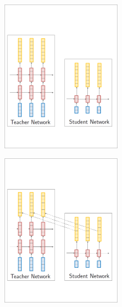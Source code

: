 \documentclass{beamer}
\newcommand{\air}{\vspace{0.25cm}}
\begin{document}
\begin{frame}
\centerline{}
\air 
\begin{figure}
\center
\includegraphics[width=6cm]{word-kd-1}
\end{figure}
\end{frame}

\begin{frame}
\centerline{}
\air
\begin{figure} 
\center
\includegraphics[width=6cm]{word-kd-2}
\end{figure}
\end{frame}


\end{document}

